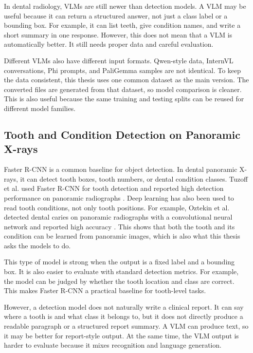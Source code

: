 \documentclass[a4paper,12pt]{report}
\begin{document}
In dental radiology, VLMs are still newer than detection models. A VLM may be useful because it can return a structured answer, not just a class label or a bounding box. For example, it can list teeth, give condition names, and write a short summary in one response. However, this does not mean that a VLM is automatically better. It still needs proper data and careful evaluation.

Different VLMs also have different input formats. Qwen-style data, InternVL conversations, Phi prompts, and PaliGemma samples are not identical. To keep the data consistent, this thesis uses one common dataset as the main version. The converted files are generated from that dataset, so model comparison is cleaner. This is also useful because the same training and testing splits can be reused for different model families.


\subsection{Tooth and Condition Detection on Panoramic X-rays}
Faster R-CNN is a common baseline for object detection. In dental panoramic X-rays, it can detect tooth boxes, tooth numbers, or dental condition classes. Tuzoff et al. used Faster R-CNN for tooth detection and reported high detection performance on panoramic radiographs \cite{tuzoff2019tooth}. Deep learning has also been used to read tooth conditions, not only tooth positions. For example, Oztekin et al. detected dental caries on panoramic radiographs with a convolutional neural network and reported high accuracy \cite{oztekin2023caries}. This shows that both the tooth and its condition can be learned from panoramic images, which is also what this thesis asks the models to do.

This type of model is strong when the output is a fixed label and a bounding box. It is also easier to evaluate with standard detection metrics. For example, the model can be judged by whether the tooth location and class are correct. This makes Faster R-CNN a practical baseline for tooth-level tasks.

However, a detection model does not naturally write a clinical report. It can say where a tooth is and what class it belongs to, but it does not directly produce a readable paragraph or a structured report summary. A VLM can produce text, so it may be better for report-style output. At the same time, the VLM output is harder to evaluate because it mixes recognition and language generation.
\end{document}
